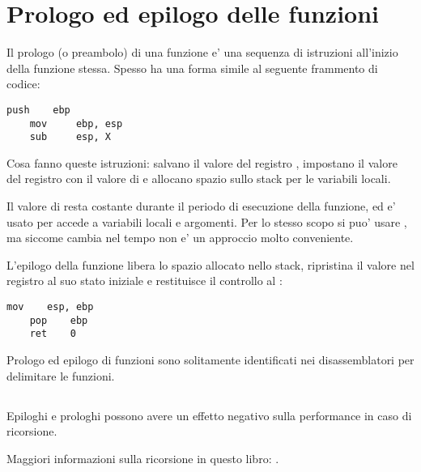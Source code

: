 \section{Prologo ed epilogo delle funzioni}
\label{sec:prologepilog}

Il prologo (o preambolo) di una funzione e' una sequenza di istruzioni all'inizio della funzione stessa.
Spesso ha una forma simile al seguente frammento di codice:

\begin{lstlisting}[style=customasmx86]
    push    ebp
    mov     ebp, esp
    sub     esp, X
\end{lstlisting}

Cosa fanno queste istruzioni: salvano il valore del registro \EBP,
impostano il valore del registro \EBP con il valore di \ESP e allocano spazio sullo stack per le variabili locali.

Il valore di \EBP resta costante durante il periodo di esecuzione della funzione, ed e' usato per accede a variabili locali e argomenti.
Per lo stesso scopo si puo' usare \ESP, ma siccome cambia nel tempo non e' un approccio molto conveniente.

L'epilogo della funzione libera lo spazio allocato nello stack, ripristina il valore nel registro \EBP al suo stato iniziale e restituisce
il controllo al :

\begin{lstlisting}[style=customasmx86]
    mov    esp, ebp
    pop    ebp
    ret    0
\end{lstlisting}

Prologo ed epilogo di funzioni sono solitamente identificati nei disassemblatori per delimitare le funzioni.

\subsection{\Recursion}

\myindex{\Recursion}
Epiloghi e prologhi possono avere un effetto negativo sulla performance in caso di ricorsione.

Maggiori informazioni sulla ricorsione in questo libro: .
